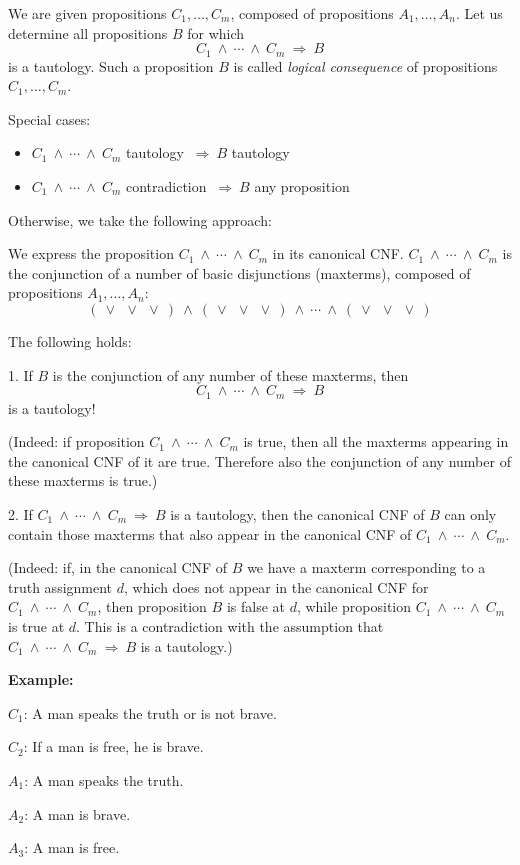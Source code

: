 \documentclass[11pt,paper=b5,footinclude,headinclude]{scrbook} %
\def\ali {{~\vee~}}
\def\inn {{~\wedge~}}
\def\sledi {{~\Rightarrow~}}
\theoremstyle{remark}
\theoremstyle{definition} %
\theoremstyle{theorem} %
\begin{document}
We are given propositions $C_1,\ldots, C_m$, composed of propositions $A_1,\ldots, A_n$.
Let us determine all propositions $B$ for which $$C_1\inn\cdots\inn C_m\sledi B$$
is a tautology. Such a proposition $B$ is called  {\em logical consequence}
of propositions $C_1,\ldots, C_m$.

Special cases:
\begin{itemize}
  \item $C_1\inn\cdots\inn C_m$ tautology  $\sledi B$ tautology
  \item $C_1\inn\cdots\inn C_m$ contradiction $\sledi B$ any proposition
\end{itemize}

Otherwise, we take the following approach:

We express the proposition $C_1\inn\cdots\inn C_m$ in its canonical CNF.
$C_1\inn\cdots\inn C_m$ is the conjunction of a number of basic disjunctions (maxterms), composed of
propositions $A_1,\ldots, A_n$:
$$( \ali\ali\ali) \inn ( \ali\ali\ali) \inn \cdots \inn (\ali\ali\ali)$$

The following holds:

1. If $B$ is the conjunction of any number of these maxterms, then
$$C_1\inn\cdots\inn C_m\sledi B$$
is a tautology!

(Indeed: if proposition $C_1\inn\cdots\inn C_m$ is true, then all the maxterms appearing in the canonical CNF of it are true. Therefore also the conjunction of any number of these maxterms is true.)

2. If $C_1\inn\cdots\inn C_m\sledi B$ is a tautology, then the canonical CNF of $B$ can only contain those maxterms that also appear
in the canonical CNF of $C_1\inn\cdots\inn C_m$.

(Indeed: if, in the canonical CNF of $B$ we have a maxterm corresponding to a truth assignment $d$, which does not appear in the canonical CNF for
$C_1\inn\cdots\inn C_m$, then proposition $B$ is false at $d$, while proposition $C_1\inn\cdots\inn C_m$ is true at $d$. This is a contradiction with the assumption that  $C_1\inn\cdots\inn C_m\sledi B$ is a tautology.)

\bigskip
\textbf{ Example:}

$C_1$: A man speaks the truth or is not brave.

$C_2$: If a man is free, he is brave.

\medskip
$A_1$: A man speaks the truth.

$A_2$: A man is brave.

$A_3$: A man is free.
\end{document}
